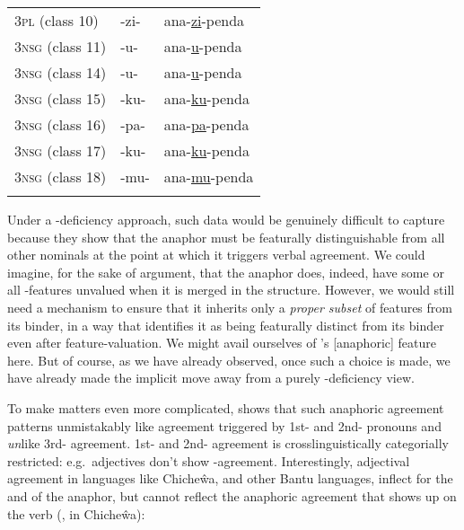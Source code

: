 \documentclass[output=paper, modfonts, nonflat]{langsci/langscibook}
\begin{document}
\begin{table}
\begin{tabularx}{\textwidth}{XXX}
  \textsc{3pl} (class 10) & -zi- & ana-\ul{zi}-penda\\
  \textsc{3nsg} (class 11) & -u- & ana-\ul{u}-penda\\
  \textsc{3nsg} (class 14) & -u- & ana-\ul{u}-penda\\
  \textsc{3nsg} (class 15) & -ku- & ana-\ul{ku}-penda\\
  \textsc{3nsg} (class 16) & -pa- & ana-\ul{pa}-penda\\
  \textsc{3nsg} (class 17) & -ku- & ana-\ul{ku}-penda\\
  \textsc{3nsg} (class 18) & -mu- & ana-\ul{mu}-penda\\
   \lspbottomrule
\end{tabularx}
\end{table}

Under a \ph-deficiency approach, such data would be genuinely
difficult to capture because they show that the anaphor must be
featurally distinguishable from all other nominals at the point at
which it triggers verbal agreement. We could imagine, for the sake of
argument, that the anaphor does, indeed, have some or all \ph-features
unvalued when it is merged in the structure. However, we would still
need a mechanism to ensure that it inherits only a \emph{proper
  subset} of features from its binder, in a way that identifies it as
being featurally distinct from its binder even after
feature-valuation. We might avail ourselves of \citet{kratzer:2009}'s
[anaphoric] feature here. But of course, as we have already observed,
once such a choice is made, we have already made the implicit move
away from a purely \ph-deficiency view.

To make matters even more complicated, \citet{baker:2008} shows that
such anaphoric agreement patterns unmistakably like agreement
triggered by 1st- and 2nd-\person{} pronouns and \emph{un}like
3rd-\person{} agreement. 1st- and 2nd-\person{} agreement is
crosslinguistically categorially restricted: e.g.\ adjectives don't
show \person-agreement. Interestingly, adjectival agreement in
languages like Chi\-che\-ŵa, and other Bantu languages, inflect for
the \num{} and \gender{} of the anaphor, but cannot reflect the
anaphoric agreement that shows up on the verb (\citealt[150--151, 86a--b]{baker:2008}, in Chicheŵa):
\end{document}
